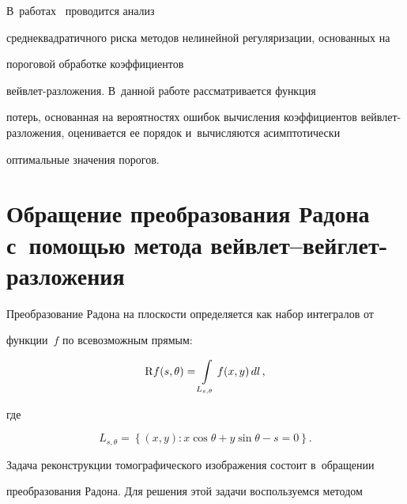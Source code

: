 В~работах~\cite{Lee97, Abr98, MSH10} проводится анализ 


среднеквадратичного риска методов нелинейной регуляризации, основанных на 


пороговой обработке коэффициентов  


вейв\-лет-раз\-ло\-же\-ния. В~данной работе рассматривается функция 


потерь, основанная на вероятностях ошибок вычисления коэффициентов вейв\-лет-раз\-ло\-же\-ния, оценивается ее порядок и~вычисляются асимптотически 


оптимальные значения порогов.











\section{Обращение преобразования Радона с~помощью метода вейвлет--вейглет-разложения}





Преобразование Радона на плоскости определяется как набор интегралов от 


функции~$f$ по всевозможным прямым:


%


\begin{equation*}


\Radon f(s,\theta) = \int\limits_{L_{s,\theta}} f(x,y) \,d l\,,




\end{equation*}


где


\begin{equation*}


{L_{s,\theta}} = \left\{(x,y)\colon x\cos\theta + y\sin\theta - s = 0 


\right\}.




\end{equation*}





Задача реконструкции томографического изображения состоит в~обращении 


преобразования Радона. Для решения этой задачи воспользуемся методом  


